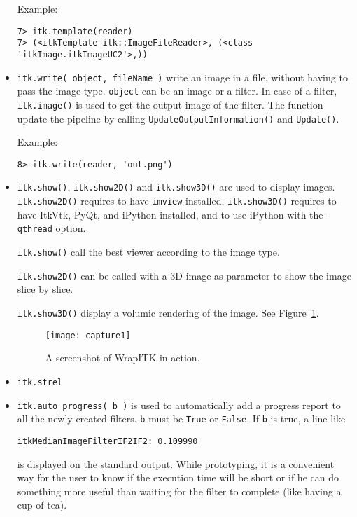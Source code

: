 \documentclass{InsightArticle}
\begin{document}
\begin{itemize}
Example:
\begin{verbatim}
7> itk.template(reader)
7> (<itkTemplate itk::ImageFileReader>, (<class 'itkImage.itkImageUC2'>,))
\end{verbatim}

  \item \verb$itk.write( object, fileName )$ write an image in a file, without
having to pass the image type.
\verb$object$ can be an image or a filter. In case of a filter, \verb$itk.image()$ is used
to get the output image of the filter. The function update the pipeline by calling
\verb$UpdateOutputInformation()$ and \verb$Update()$.

Example:
\begin{verbatim}
8> itk.write(reader, 'out.png')
\end{verbatim}

  \item \verb$itk.show()$, \verb$itk.show2D()$ and \verb$itk.show3D()$ are used to
display images. \verb$itk.show2D()$ requires to have \verb$imview$ installed.
\verb$itk.show3D()$ requires to have ItkVtk, PyQt, and iPython installed, and to use
iPython with the \verb$-qthread$ option.

\verb$itk.show()$ call the best viewer according to the image type.

\verb$itk.show2D()$
can be called with a 3D image as parameter to show the image slice by slice.

\verb$itk.show3D()$ display a volumic rendering of the image. See Figure~\ref{screenshot}.

\begin{figure}[htbp]
\centering
\texttt{[image: capture1]}
\caption{A screenshot of WrapITK in action.\label{screenshot}}
\end{figure}

  \item \verb$itk.strel$

  \item \verb$itk.auto_progress( b )$ is used to automatically add a progress report
to all the newly created filters. \verb$b$ must be \verb$True$ or \verb$False$. If
\verb$b$ is true, a line like
\begin{verbatim}
itkMedianImageFilterIF2IF2: 0.109990
\end{verbatim}
is displayed on the standard output. 
While prototyping, it is a convenient way for the user to know if
the execution time will be short or if he can do something more useful than waiting
for the filter to complete (like having a cup of tea).


\end{itemize}
\end{document}
